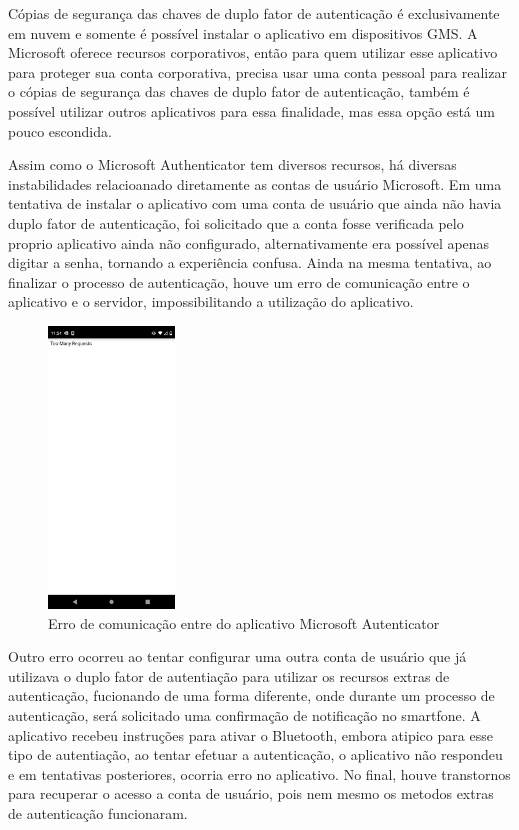 \documentclass[12pt]{article}
\begin{document}
Cópias de segurança das chaves de duplo fator de autenticação é exclusivamente em
nuvem e somente é possível instalar o aplicativo em dispositivos GMS.
A Microsoft oferece recursos corporativos, então para quem utilizar esse
aplicativo para proteger sua conta corporativa, precisa usar uma conta pessoal
para realizar o cópias de segurança das chaves de duplo fator de autenticação, também
é possível utilizar outros aplicativos para essa finalidade, mas essa opção está um
pouco escondida.

Assim como o Microsoft Authenticator tem diversos recursos, há diversas instabilidades
relacioanado diretamente as contas de usuário Microsoft.
Em uma tentativa de instalar o aplicativo com uma conta de usuário que ainda não havia
duplo fator de autenticação, foi solicitado que a conta fosse verificada pelo proprio
aplicativo ainda não configurado, alternativamente era possível apenas digitar a senha,
tornando a experiência confusa.
Ainda na mesma tentativa, ao finalizar o processo de autenticação, houve um erro de
comunicação entre o aplicativo e o servidor, impossibilitando a utilização do aplicativo.

\begin{figure}[h!]
  \centering
  \includegraphics[width=0.3\textwidth]{./assets/microsoft_error_1.jpg}
  \caption{Erro de comunicação entre do aplicativo Microsoft Autenticator}
  \label{fig:MicrosoftAutenticatorErrorToManyReequests}
\end{figure}

Outro erro ocorreu ao tentar configurar uma outra conta de usuário que já utilizava o
duplo fator de autentiação para utilizar os recursos extras de autenticação, fucionando
de uma forma diferente, onde durante um processo de autenticação, será solicitado uma
confirmação de notificação no smartfone.
A aplicativo recebeu instruções para ativar o Bluetooth, embora atipico para esse tipo
de autentiação, ao tentar efetuar a autenticação, o aplicativo não respondeu e em tentativas
posteriores, ocorria erro no aplicativo.
No final, houve transtornos para recuperar o acesso a conta de usuário, pois nem mesmo os
metodos extras de autenticação funcionaram.
\end{document}
